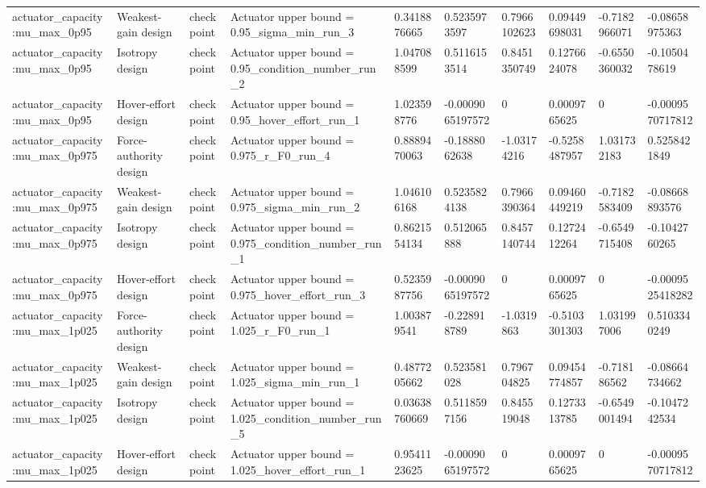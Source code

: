 \begin{tabular}{@{}llllllllll@{}}
actuator\_capacity:mu\_max\_0p95 & Weakest-gain design & checkpoint & Actuator upper bound = 0.95\_sigma\_min\_run\_3 & 0.3418876665 & 0.5235973597 & 0.7966102623 & 0.09449698031 & -0.7182966071 & -0.08658975363 \\
actuator\_capacity:mu\_max\_0p95 & Isotropy design & checkpoint & Actuator upper bound = 0.95\_condition\_number\_run\_2 & 1.047088599 & 0.5116153514 & 0.8451350749 & 0.1276624078 & -0.6550360032 & -0.1050478619 \\
actuator\_capacity:mu\_max\_0p95 & Hover-effort design & checkpoint & Actuator upper bound = 0.95\_hover\_effort\_run\_1 & 1.023598776 & -0.0009065197572 & 0 & 0.0009765625 & 0 & -0.0009570717812 \\
actuator\_capacity:mu\_max\_0p975 & Force-authority design & checkpoint & Actuator upper bound = 0.975\_r\_F0\_run\_4 & 0.8889470063 & -0.1888062638 & -1.03174216 & -0.5258487957 & 1.031732183 & 0.5258421849 \\
actuator\_capacity:mu\_max\_0p975 & Weakest-gain design & checkpoint & Actuator upper bound = 0.975\_sigma\_min\_run\_2 & 1.046106168 & 0.5235824138 & 0.7966390364 & 0.09460449219 & -0.7182583409 & -0.08668893576 \\
actuator\_capacity:mu\_max\_0p975 & Isotropy design & checkpoint & Actuator upper bound = 0.975\_condition\_number\_run\_1 & 0.8621554134 & 0.512065888 & 0.8457140744 & 0.1272412264 & -0.6549715408 & -0.1042760265 \\
actuator\_capacity:mu\_max\_0p975 & Hover-effort design & checkpoint & Actuator upper bound = 0.975\_hover\_effort\_run\_3 & 0.5235987756 & -0.0009065197572 & 0 & 0.0009765625 & 0 & -0.0009525418282 \\
actuator\_capacity:mu\_max\_1p025 & Force-authority design & checkpoint & Actuator upper bound = 1.025\_r\_F0\_run\_1 & 1.003879541 & -0.228918789 & -1.0319863 & -0.5103301303 & 1.031997006 & 0.5103340249 \\
actuator\_capacity:mu\_max\_1p025 & Weakest-gain design & checkpoint & Actuator upper bound = 1.025\_sigma\_min\_run\_1 & 0.4877205662 & 0.523581028 & 0.796704825 & 0.09454774857 & -0.718186562 & -0.08664734662 \\
actuator\_capacity:mu\_max\_1p025 & Isotropy design & checkpoint & Actuator upper bound = 1.025\_condition\_number\_run\_5 & 0.03638760669 & 0.5118597156 & 0.845519048 & 0.1273313785 & -0.6549001494 & -0.1047242534 \\
actuator\_capacity:mu\_max\_1p025 & Hover-effort design & checkpoint & Actuator upper bound = 1.025\_hover\_effort\_run\_1 & 0.9541123625 & -0.0009065197572 & 0 & 0.0009765625 & 0 & -0.0009570717812 \\

\end{tabular}
